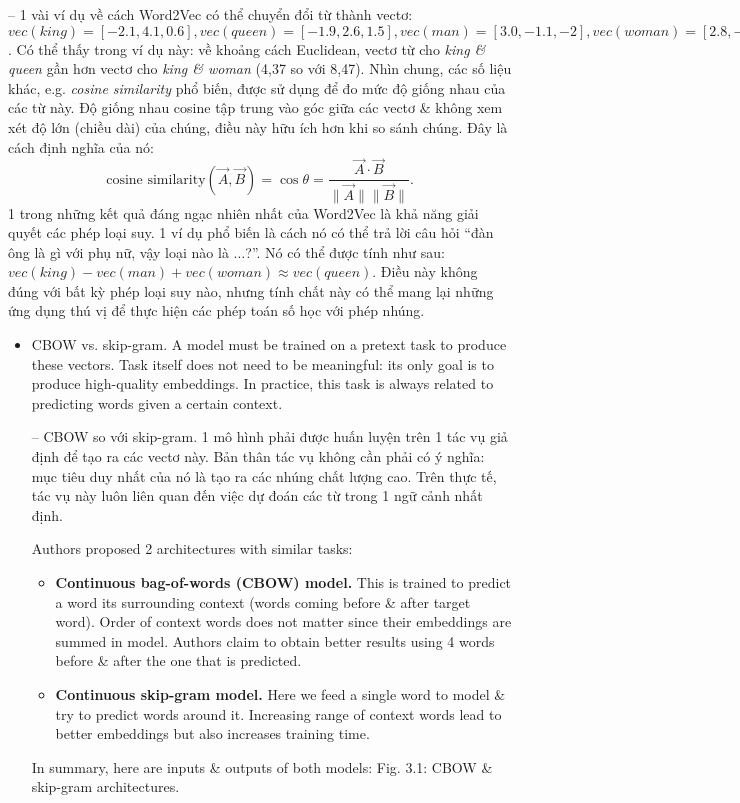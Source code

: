 \documentclass{article}
\begin{document}
\begin{itemize}
\begin{itemize}
        -- 1 vài ví dụ về cách Word2Vec có thể chuyển đổi từ thành vectơ: $vec(king) = [-2.1,4.1,0.6],vec(queen) = [-1.9,2.6,1.5],vec(man) = [3.0,-1.1,-2],vec(woman) = [2.8,-2.6,-1.1]$. Có thể thấy trong ví dụ này: về khoảng cách Euclidean, vectơ từ cho {\it king \& queen} gần hơn vectơ cho {\it king \& woman} (4,37 so với 8,47). Nhìn chung, các số liệu khác, e.g. {\it cosine similarity} phổ biến, được sử dụng để đo mức độ giống nhau của các từ này. Độ giống nhau cosine tập trung vào góc giữa các vectơ \& không xem xét độ lớn (chiều dài) của chúng, điều này hữu ích hơn khi so sánh chúng. Đây là cách định nghĩa của nó:
        \begin{equation*}
            \mbox{cosine similarity}(\vec{A},\vec{B}) = \cos\theta = \frac{\vec{A}\cdot\vec{B}}{\|\vec{A}\|\|\vec{B}\|}.
        \end{equation*}
        1 trong những kết quả đáng ngạc nhiên nhất của Word2Vec là khả năng giải quyết các phép loại suy. 1 ví dụ phổ biến là cách nó có thể trả lời câu hỏi ``đàn ông là gì với phụ nữ, vậy loại nào là $\ldots$?''. Nó có thể được tính như sau: $vec(king) - vec(man) + vec(woman)\approx vec(queen)$. Điều này không đúng với bất kỳ phép loại suy nào, nhưng tính chất này có thể mang lại những ứng dụng thú vị để thực hiện các phép toán số học với phép nhúng.
        \begin{itemize}
            \item {\sf CBOW vs. skip-gram.} A model must be trained on a pretext task to produce these vectors. Task itself does not need to be meaningful: its only goal is to produce high-quality embeddings. In practice, this task is always related to predicting words given a certain context.

            -- {\sf CBOW so với skip-gram.} 1 mô hình phải được huấn luyện trên 1 tác vụ giả định để tạo ra các vectơ này. Bản thân tác vụ không cần phải có ý nghĩa: mục tiêu duy nhất của nó là tạo ra các nhúng chất lượng cao. Trên thực tế, tác vụ này luôn liên quan đến việc dự đoán các từ trong 1 ngữ cảnh nhất định.

            Authors proposed 2 architectures with similar tasks:
            \begin{itemize}
                \item {\bf Continuous bag-of-words (CBOW) model.} This is trained to predict a word its surrounding context (words coming before \& after target word). Order of context words does not matter since their embeddings are summed in model. Authors claim to obtain better results using 4 words before \& after the one that is predicted.
                \item {\bf Continuous skip-gram model.} Here we feed a single word to model \& try to predict words around it. Increasing range of context words lead to better embeddings but also increases training time.
            \end{itemize}
            In summary, here are inputs \& outputs of both models: {\sf Fig. 3.1: CBOW \& skip-gram architectures.}


\end{itemize}
\end{itemize}
\end{itemize}
\end{document}
